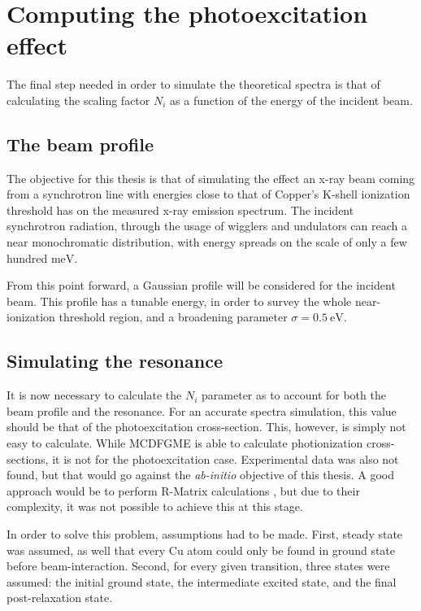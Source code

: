 \section{Computing the photoexcitation effect}


The final step needed  in order to simulate the theoretical spectra is that of calculating the scaling factor $N_i$ as a function of the energy of the incident beam.

\subsection{The beam profile}


The objective for this thesis is that of simulating the effect an x-ray beam coming from a synchrotron line with energies close to that of Copper's K-shell ionization  threshold has on the measured x-ray emission spectrum. The incident synchrotron radiation, through the usage of wigglers and undulators can reach a near monochromatic distribution, with energy spreads on the scale of only a few hundred $\si{\milli\electronvolt}$.


From this point forward, a Gaussian profile will be considered for the incident beam. This profile has a tunable energy, in order to survey the whole near-ionization threshold region, and a broadening parameter $\sigma=0.5\ \si{\electronvolt}$.

\subsection{Simulating the resonance}

It is now necessary to calculate the $N_i$ parameter as to account for both the beam profile and the resonance. For an accurate spectra simulation, this value should be that of the photoexcitation cross-section. This, however, is simply not easy to calculate. While \gls{MCDFGME} is able to calculate photionization cross-sections, it is not for the photoexcitation case. Experimental data was also not found, but that would go against the \textit{ab-initio} objective of this thesis. A good approach would be to perform R-Matrix calculations , but due to their complexity, it was not possible to achieve this at this stage.

In order to solve this problem, assumptions had to be made. First, steady state was assumed, as well that every Cu atom could only be found in ground state before beam-interaction. Second, for every given transition, three states were assumed: the initial ground state, the intermediate excited state, and the final post-relaxation state.

